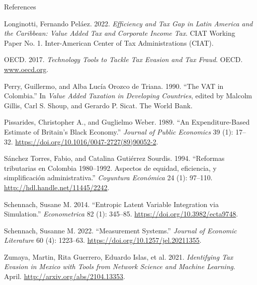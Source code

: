 \documentclass[
  ignorenonframetext,
  aspectratio=169,
]{beamer}
\newlength{\cslhangindent}
\newenvironment{CSLReferences}[2] %
 {\begin{list}{}{%
  \setlength{\itemindent}{0pt}
  \setlength{\leftmargin}{0pt}
  \setlength{\parsep}{0pt}
  \ifodd #1
   \setlength{\leftmargin}{\cslhangindent}
   \setlength{\itemindent}{-1\cslhangindent}
  \fi
  \setlength{\itemsep}{#2\baselineskip}}}
 {\end{list}}
\begin{document}
\begin{frame}{References}
\begin{CSLReferences}{1}{1}
Longinotti, Fernando Peláez. 2022. \emph{Efficiency and Tax Gap in
{Latin America} and the {Caribbean}: Value Added Tax and Corporate
Income Tax}. CIAT Working Paper No. 1. Inter-American Center of Tax
Administrations (CIAT).

OECD. 2017. \emph{Technology Tools to Tackle Tax Evasion and Tax Fraud}.
OECD. \href{https://www.oecd.org}{www.oecd.org}.

Perry, Guillermo, and Alba Lucía Orozco de Triana. 1990. {``The VAT in
Colombia.''} In \emph{Value Added Taxation in Developing Countries},
edited by Malcolm Gillis, Carl S. Shoup, and Gerardo P. Sicat. The World
Bank.

Pissarides, Christopher A., and Guglielmo Weber. 1989. {``An
Expenditure-Based Estimate of Britain's Black Economy.''} \emph{Journal
of Public Economics} 39 (1): 17--32.
\url{https://doi.org/10.1016/0047-2727(89)90052-2}.

Sánchez Torres, Fabio, and Catalina Gutiérrez Sourdis. 1994. {``Reformas
tributarias en {Colombia} 1980--1992. {Aspectos} de equidad, eficiencia,
y simplificaci{ó}n administrativa.''} \emph{Coyuntura Econ{ó}mica} 24
(1): 97--110. \url{http://hdl.handle.net/11445/2242}.

Schennach, Susane M. 2014. {``Entropic Latent Variable Integration via
Simulation.''} \emph{Econometrica} 82 (1): 345--85.
\url{https://doi.org/10.3982/ecta9748}.

Schennach, Susanne M. 2022. {``Measurement Systems.''} \emph{Journal of
Economic Literature} 60 (4): 1223--63.
\url{https://doi.org/10.1257/jel.20211355}.

Zumaya, Martin, Rita Guerrero, Eduardo Islas, et al. 2021.
\emph{Identifying Tax Evasion in Mexico with Tools from Network Science
and Machine Learning}. April. \url{http://arxiv.org/abs/2104.13353}.

\end{CSLReferences}
\end{frame}
\end{document}
